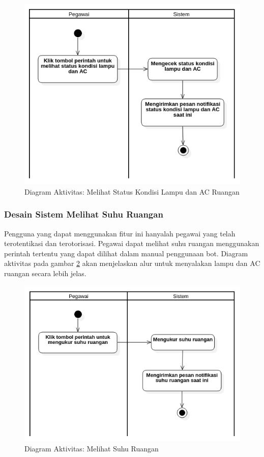\begin{figure}[H]
	\centerline {
		\includegraphics[width=\linewidth]{bab4/img/activity_diagram_melihatstatus.png}
	}
	\caption{Diagram Aktivitas: Melihat Status Kondisi Lampu dan AC Ruangan}
	\label{figure:activity_3}
\end{figure}

\subsubsection{Desain Sistem Melihat Suhu Ruangan}
\tab Pengguna yang dapat menggunakan fitur ini hanyalah pegawai yang telah terotentikasi dan terotorisasi. Pegawai dapat melihat suhu ruangan menggunakan perintah tertentu yang dapat dilihat dalam manual penggunaan bot. Diagram aktivitas pada gambar \ref{figure:activity_4} akan menjelaskan alur untuk menyalakan lampu dan AC ruangan secara lebih jelas.

\begin{figure}[H]
	\centerline {
		\includegraphics[width=\linewidth]{bab4/img/activity_diagram_mengukursuhu.png}
	}
	\caption{Diagram Aktivitas: Melihat Suhu Ruangan}
	\label{figure:activity_4}
\end{figure}
